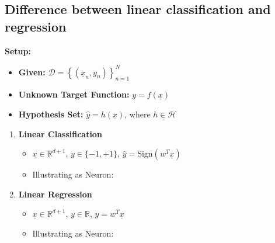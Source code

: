 \subsection{Difference between linear classification and regression}
\begin{definition}
    \textbf{Setup:}
    \begin{itemize}
        \item \textbf{Given:} $\mathcal{D} = \left\{ \left( \underline{x}_n, y_n \right) \right\}_{n=1}^{N}$
        \item \textbf{Unknown Target Function:} $y = f(\underline{x})$
        \item \textbf{Hypothesis Set:} $\hat{y} = h(\underline{x})$, where $h \in \mathcal{H}$
    \end{itemize}
    \vspace{1em}

    \begin{enumerate}
        \item \textbf{Linear Classification}
        \begin{itemize}
            \item $\underline{x} \in \mathbb{R}^{d+1}$, $y \in \{-1, +1\}$, $\hat{y} = \text{Sign}\left(w^T \underline{x}\right)$
            \item Illustrating as Neuron:
        \end{itemize}
    
        \item \textbf{Linear Regression}
        \begin{itemize}
            \item $\underline{x} \in \mathbb{R}^{d+1}$, $y \in \mathbb{R}$, $\hat{y} = w^T \underline{x}$
            \item Illustrating as Neuron:
        \end{itemize}
    \end{enumerate}
\end{definition}

